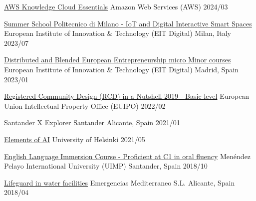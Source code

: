 \begin{cvcerts}
	
	\cvcert
	{\href{https://www.credly.com/badges/7da96cd9-1320-41f2-912d-9eda06081e23/public_url}{AWS Knowledge Cloud Essentials}} %
	{Amazon Web Services (AWS)} %
	{} %
	{2024/03} %
		
	\cvcertl
	{\href{https://1drv.ms/b/s!AkPthURenJLHi8VwxViOEyun28FUSQ?e=pmHmht}{Summer School Politecnico di Milano - IoT and Digital Interactive Smart Spaces}} %
	{European Institute of Innovation \& Technology (EIT Digital)} %
	{Milan, Italy} %
	{2023/07} %
	
	\cvcertl
	{\href{https://1drv.ms/b/s!AkPthURenJLHi8Vv_LR_7tQx06e70A?e=2RH5ut}{Distributed and Blended European Entrepreneurship micro Minor courses}} %
	{European Institute of Innovation \& Technology (EIT Digital)} %
	{Madrid, Spain} %
	{2023/01} %
		
	\cvcertl
	{\href{https://1drv.ms/b/s!AkPthURenJLHi8VrvSI_c4n7xcJCYQ?e=RW9j9U}{Registered Community Design (RCD) in a Nutshell 2019 - Basic level}} %
	{European Union Intellectual Property Office (EUIPO)} %
	{} %
	{2022/02} %
			
	\cvcert
	{Santander X Explorer} %
	{Santander} %
	{Alicante, Spain} %
	{2021/01} %
				
	\cvcert
	{\href{https://1drv.ms/b/s!AkPthURenJLHi8VsA1LqmEh4eUHdwg?e=kSERNG}{Elements of AI}} %
	{University of Helsinki} %
	{} %
	{2021/05} %
			
	\cvcertl
	{\href{https://1drv.ms/b/s!AkPthURenJLHi8Vx6tme1nLdTLFksw?e=fgHyIm}{English Language Immersion Course - Proficient at C1 in oral fluency}} %
	{Menéndez Pelayo International University (UIMP)} %
	{Santander, Spain} %
	{2018/10} %
				
	\cvcertl
	{\href{https://1drv.ms/b/s!AkPthURenJLHi8VyUpFrgflu8ICUhw?e=OLzRDm}{Lifeguard in water facilities}} %
	{Emergencias Mediterraneo S.L.} %
	{Alicante, Spain} %
	{2018/04} %
	
\end{cvcerts}
